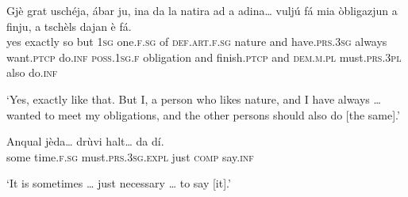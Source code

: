 \begin{linenumbers}
\gll Gjè grat uschéja, ábar ju, ina da la natira ad a adina… vuljú fá mia òbligazjun a finju, a tschèls dajan è fá.   \\
yes exactly so but \textsc{1sg} one.\textsc{f.sg} of \textsc{def.art.f.sg} nature and have.\textsc{prs.3sg} always want.\textsc{ptcp} do.\textsc{inf} \textsc{poss.1sg.f} obligation and finish.\textsc{ptcp} and \textsc{dem.m.pl} must.\textsc{prs.3pl} also do.\textsc{inf}\\
\end{linenumbers}
\medskip
\glt `Yes, exactly like that. But I, a person who likes nature, and I have always … wanted to meet my obligations, and the other persons should also do [the same].'\medskip

\begin{linenumbers}
\gll  Anqual jèda… drùvi halt… da dí.  \\
some time.\textsc{f.sg} must.\textsc{prs.3sg.expl} just \textsc{comp} say.\textsc{inf}\\
\end{linenumbers}
\medskip
\glt `It is sometimes … just necessary … to say [it].'
\medskip


